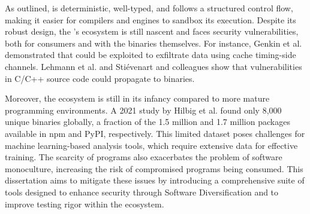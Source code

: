 
As outlined, \Wasm is deterministic, well-typed, and follows a structured control flow, making it easier for compilers and engines to sandbox its execution\cite{WebAssemblySecurity}. 
Despite its robust design, the \Wasm's ecosystem is still nascent and faces security vulnerabilities, both for \Wasm consumers and with the \Wasm binaries themselves. 
For instance, Genkin et al. demonstrated that \Wasm could be exploited to exfiltrate data using cache timing-side channels\cite{Genkin2018DrivebyKC}. 
Lehmann et al. and Stiévenart and colleagues show that vulnerabilities in C/C++ source code could propagate to \Wasm binaries\cite{usenixWasm2020, DeRoover2022}.

Moreover, the \Wasm ecosystem is still in its infancy compared to more mature programming environments. 
A 2021 study by Hilbig et al. found only 8,000 unique \Wasm binaries globally\cite{Hilbig2021AnES}, a fraction of the 1.5 million and 1.7 million packages available in npm and PyPI, respectively. 
This limited dataset poses challenges for machine learning-based analysis tools, which require extensive data for effective training. 
The scarcity of \Wasm programs also exacerbates the problem of software monoculture, increasing the risk of compromised \Wasm programs being consumed\cite{usenixWasm2020}. 
This dissertation aims to mitigate these issues by introducing a comprehensive suite of tools designed to enhance \Wasm security through Software Diversification and to improve testing rigor within the ecosystem.

